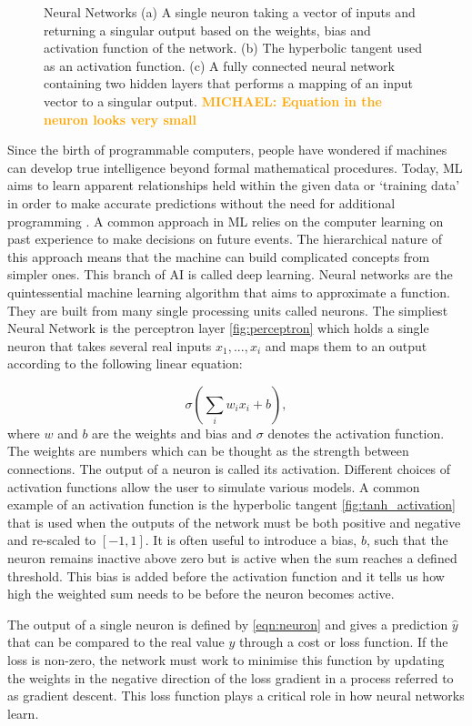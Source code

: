 \documentclass[12pt]{iopart}
\newcommand{\michael}[1]{\textbf{\textcolor{orange}{MICHAEL: #1}}}
\begin{document}
\begin{figure}
\begin{minipage}[b]{0.7\linewidth}
    \end{minipage}
    \caption{Neural Networks (a) A single neuron taking a vector of inputs and returning a singular output based on the weights, bias and activation function of the network. (b) The hyperbolic tangent used as an activation function. (c) A fully connected neural network containing two hidden layers that performs a mapping of an input vector to a singular output. \michael{Equation in the neuron looks very small}}
\end{figure}

Since the birth of programmable computers, people have wondered if machines can develop true intelligence beyond formal mathematical procedures. Today, ML aims to learn apparent relationships held within the given data or `training data' in order to make accurate predictions without the need for additional programming . A common approach in ML relies on the computer learning on past experience to make decisions on future events. The hierarchical nature of this approach means that the machine can build complicated concepts from simpler ones. This branch of AI is called deep learning.
Neural networks are the quintessential machine learning algorithm that aims to approximate a function. They are built from many single processing units called neurons. The simpliest Neural Network is the perceptron layer \cref{fig:perceptron} which holds a single neuron that takes several real inputs $x_{1}, ... , x_{i}$ and maps them to an output according to the following linear equation: 

\begin{equation}
\sigma(\sum_i w_i x_i + b),
\label{eqn:neuron}
\end{equation}
where $w$ and $b$ are the weights and bias and $\sigma$ denotes the activation function. The weights are numbers which can be thought as the strength between connections. The output of a neuron is called its activation. Different choices of activation functions allow the user to simulate various models. A common example of an activation function is the hyperbolic tangent \cref{fig:tanh_activation} that is used when the outputs of the network must be both positive and negative and re-scaled to $[-1,1]$. It is often useful to introduce a bias, $b$, such that the neuron remains inactive above zero but is active when the sum reaches a defined threshold. This bias is added before the activation function and it tells us how high the weighted sum needs to be before the neuron becomes active.

The output of a single neuron is defined by \cref{eqn:neuron} and gives a prediction $\hat{y}$ that can be compared to the real value $y$ through a cost or loss function. If the loss is non-zero, the network must work to minimise this function by updating the weights in the negative direction of the loss gradient in a process referred to as gradient descent. This loss function plays a critical role in how neural networks learn.
\end{document}
